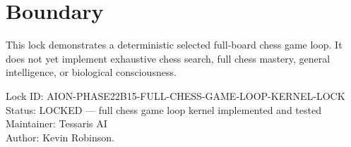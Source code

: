 \documentclass[11pt,a4paper]{article}
\begin{document}
\section{Boundary}

This lock demonstrates a deterministic selected full-board chess game loop. It does not yet implement exhaustive chess search, full chess mastery, general intelligence, or biological consciousness.

\bigskip

\noindent
Lock ID: AION-PHASE22B15-FULL-CHESS-GAME-LOOP-KERNEL-LOCK\\
Status: LOCKED --- full chess game loop kernel implemented and tested\\
Maintainer: Tessaris AI\\
Author: Kevin Robinson.
\end{document}
